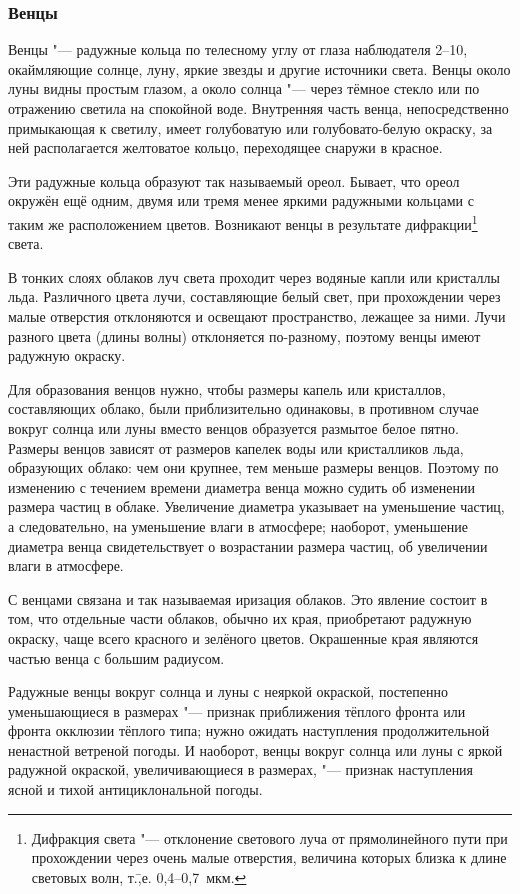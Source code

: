 \subsubsection{Венцы}

Венцы "--- радужные кольца по телесному углу от глаза наблюдателя
2--10\gr, окаймляющие солнце, луну, яркие звезды и другие источники
света. Венцы около луны видны простым глазом, а около солнца "--- через
тёмное стекло или по отражению светила на спокойной воде. Внутренняя
часть венца, непосредственно примыкающая к светилу, имеет голубоватую
или голубовато-белую окраску, за ней располагается желтоватое кольцо,
переходящее снаружи в красное.

Эти радужные кольца образуют так называемый ореол. Бывает, что ореол
окружён ещё одним, двумя или тремя менее яркими радужными кольцами с
таким же расположением цветов. Возникают венцы в результате
дифракции\footnote{Дифракция света "--- отклонение светового луча от
  прямолинейного пути при прохождении через очень малые отверстия,
  величина которых близка к длине световых волн,
  т.\=,е. 0,4--0,7~мкм.} света.

В тонких слоях облаков луч света проходит через водяные капли или
кристаллы льда. Различного цвета лучи, составляющие белый свет, при
прохождении через малые отверстия отклоняются и освещают пространство,
лежащее за ними. Лучи разного цвета (длины волны) отклоняется
по-разному, поэтому венцы имеют радужную окраску.

Для образования венцов нужно, чтобы размеры капель или кристаллов,
составляющих облако, были приблизительно одинаковы, в противном случае
вокруг солнца или луны вместо венцов образуется размытое белое
пятно. Размеры венцов зависят от размеров капелек воды или
кристалликов льда, образующих облако: чем они крупнее, тем меньше
размеры венцов. Поэтому по изменению с течением времени диаметра венца
можно судить об изменении размера частиц в облаке. Увеличение диаметра
указывает на уменьшение частиц, а следовательно, на уменьшение влаги в
атмосфере; наоборот, уменьшение диаметра венца свидетельствует о
возрастании размера частиц, об увеличении влаги в атмосфере.

С венцами связана и так называемая иризация облаков. Это явление
состоит в том, что отдельные части облаков, обычно их края,
приобретают радужную окраску, чаще всего красного и зелёного
цветов. Окрашенные края являются частью венца с большим радиусом.

 Радужные венцы вокруг солнца и луны с неяркой окраской,
постепенно уменьшающиеся в размерах "--- признак приближения тёплого
фронта или фронта окклюзии тёплого типа; нужно ожидать наступления
продолжительной ненастной ветреной погоды. И наоборот, венцы вокруг
солнца или луны с яркой радужной окраской, увеличивающиеся в размерах,
"--- признак наступления ясной и тихой антициклональной погоды.

